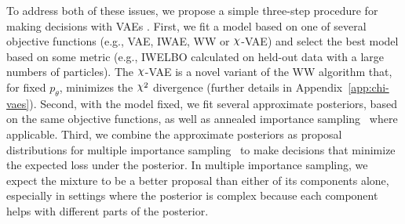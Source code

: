 To address both of these issues, we propose a simple three-step procedure for making decisions with VAEs . First, we fit a model based on one of several objective functions (e.g., VAE, IWAE, WW or $\rchi$-VAE) and select the best model based on some metric (e.g., IWELBO calculated on held-out data with a large numbers of particles). The $\rchi$-VAE is a novel variant of the WW algorithm that, for fixed $p_\theta$, minimizes the $\rchi^2$ divergence (further details in Appendix~\ref{app:chi-vaes}). %
Second, with the model fixed, we fit several approximate posteriors, based on the same objective functions, as well as annealed importance sampling~\cite{wu2016quantitative} where applicable. Third, we combine the approximate posteriors as proposal distributions for multiple importance sampling~\cite{veach1995optimally} to make decisions that minimize the expected loss under the posterior. 
In multiple importance sampling, we expect the mixture to be a better proposal than either of its components alone, especially in settings where the posterior is complex because each component helps with different parts of the posterior.

